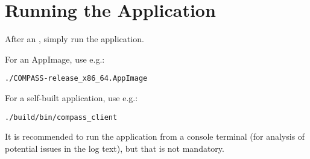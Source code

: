 
\section{Running the Application}

After an , simply run the application.

For an AppImage, use e.g.:
\begin{lstlisting}
./COMPASS-release_x86_64.AppImage
\end{lstlisting}

For a self-built application, use e.g.:
\begin{lstlisting}
./build/bin/compass_client
\end{lstlisting}

It is recommended to run the application from a console terminal (for analysis of potential issues in the log text), but that is not mandatory.
